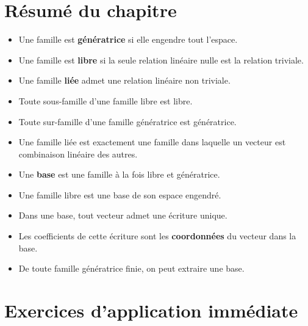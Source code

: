 \documentclass[11pt,a4paper]{article}
\theoremstyle{remark}
\begin{document}
\section{Résumé du chapitre}

\begin{itemize}
    \item Une famille est \textbf{génératrice} si elle engendre tout l’espace.
    \item Une famille est \textbf{libre} si la seule relation linéaire nulle est la relation triviale.
    \item Une famille \textbf{liée} admet une relation linéaire non triviale.
    \item Toute sous-famille d’une famille libre est libre.
    \item Toute sur-famille d’une famille génératrice est génératrice.
    \item Une famille liée est exactement une famille dans laquelle un vecteur est combinaison linéaire des autres.
    \item Une \textbf{base} est une famille à la fois libre et génératrice.
    \item Une famille libre est une base de son espace engendré.
    \item Dans une base, tout vecteur admet une écriture unique.
    \item Les coefficients de cette écriture sont les \textbf{coordonnées} du vecteur dans la base.
    \item De toute famille génératrice finie, on peut extraire une base.
\end{itemize}

\section*{Exercices d’application immédiate}
\end{document}
